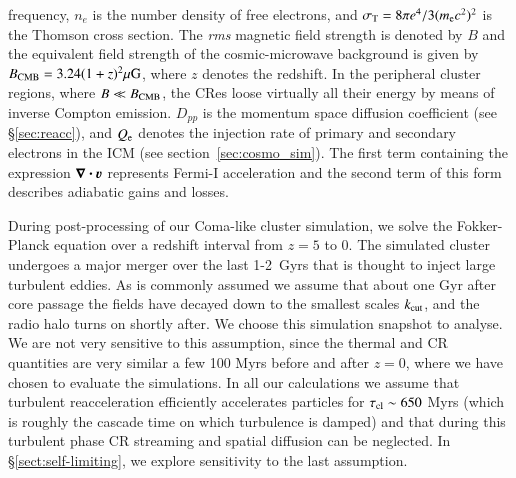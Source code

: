 \documentclass[fleqn,usenatbib,useAMS]{mnras}
\newcommand{\bcdot}{\ensuremath{%
  \mathchoice%
   {\mskip\thinmuskip\lower0.2ex\hbox{\scalebox{1.5}{$\cdot$}}\mskip\thinmuskip}}%
   {\mskip\thinmuskip\lower0.2ex\hbox{\scalebox{1.5}{$\cdot$}}\mskip\thinmuskip}%
   {\lower0.3ex\hbox{\scalebox{1.2}{$\cdot$}}}%
   {\lower0.3ex\hbox{\scalebox{1.2}{$\cdot$}}}%
}
\newcommand{\bvel}{\ensuremath{\boldsymbol{\varv}}}
\newcommand{\bnabla}{\ensuremath{\boldsymbol{\nabla}}}
\begin{document}
frequency, $n_e$ is the number density of free electrons, and
$\sigma_{\mathrm{T}}= 8\pi e^4/3(m_{{\mathrm{e}}} c^2)^2$ is the Thomson cross
section. The {\it rms} magnetic field strength is denoted by $B$ and
the equivalent field strength of the cosmic-microwave background is
given by $B_{\mathrm{CMB}} = 3.24 (1 + z)^2\mu{\mathrm{G}}$, where $z$ denotes
the redshift. In the peripheral cluster regions, where $B \ll
B_{\mathrm{CMB}}$, the CRes loose virtually all their energy by means of
inverse Compton emission. $D_{pp}$ is the momentum space diffusion
coefficient (see \S\ref{sec:reacc}), and
$Q_{{\mathrm{e}}}$ denotes the injection rate of primary and secondary
electrons in the ICM (see section~\ref{sec:cosmo_sim}). The first term
containing the expression $\bnabla\bcdot \bvel$ represents Fermi-I
acceleration and the second term of this form describes adiabatic
gains and losses.

During post-processing of our Coma-like cluster simulation, we solve the
Fokker-Planck equation over a redshift interval from $z=5$ to 0. The simulated
cluster undergoes a major merger over the last 1-2~Gyrs that is thought to
inject large turbulent eddies. As is commonly assumed
\citep{brunetti07,brunetti11,2004ApJ...614..757Y,2013ApJ...771..131B} we assume
that about one Gyr after core passage the fields have decayed down to the
smallest scales $k_{\rm cut}$, and the radio halo turns on shortly after. We
choose this simulation snapshot to analyse. We are not very sensitive to this
assumption, since the thermal and CR quantities are very similar a few 100 Myrs
before and after $z = 0$, where we have chosen to evaluate the simulations. In
all our calculations we assume that turbulent reacceleration efficiently
accelerates particles for $\tau_{\rm cl} \sim 650$ Myrs (which is roughly the
cascade time on which turbulence is damped) and that during this turbulent phase
CR streaming and spatial diffusion can be neglected. In
\S\ref{sect:self-limiting}, we explore sensitivity to the last assumption.
\end{document}
